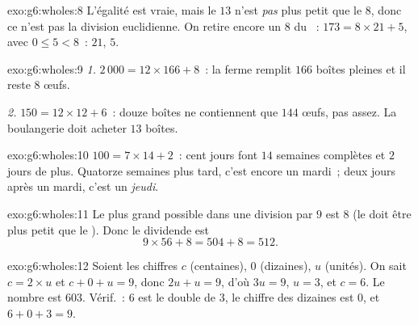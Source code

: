 \begin{solution}{exo:g6:wholes:8}
L'égalité est vraie, mais le  $13$ n'est \emph{pas} plus petit
que le  $8$, donc ce n'est pas la division euclidienne. On
retire encore un $8$ du ~: $173 = 8 \times 21 + 5$, avec
$0 \leq 5 < 8$~:  $21$,  $5$.
\end{solution}

\begin{solution}{exo:g6:wholes:9}
\emph{1.} $2\,000 = 12 \times 166 + 8$~: la ferme remplit $166$
boîtes pleines et il reste $8$ œufs.

\emph{2.} $150 = 12 \times 12 + 6$~: douze boîtes ne contiennent que
$144$ œufs, pas assez. La boulangerie doit acheter $13$ boîtes.
\end{solution}

\begin{solution}{exo:g6:wholes:10}
$100 = 7 \times 14 + 2$~: cent jours font $14$ semaines complètes et
$2$ jours de plus. Quatorze semaines plus tard, c'est encore un
mardi~; deux jours après un mardi, c'est un \emph{jeudi}.
\end{solution}

\begin{solution}{exo:g6:wholes:11}
Le plus grand  possible dans une division par $9$ est $8$ (le
 doit être plus petit que le ). Donc le dividende est
\[
9 \times 56 + 8 = 504 + 8 = 512 .
\]
\end{solution}

\begin{solution}{exo:g6:wholes:12}
Soient les chiffres $c$ (centaines), $0$ (dizaines), $u$ (unités).
On sait $c = 2 \times u$ et $c + 0 + u = 9$, donc $2u + u = 9$, d'où
$3u = 9$, $u = 3$, et $c = 6$. Le nombre est $603$. Vérif.~: $6$ est
le double de $3$, le chiffre des dizaines est $0$, et $6 + 0 + 3 = 9$.
\end{solution}

